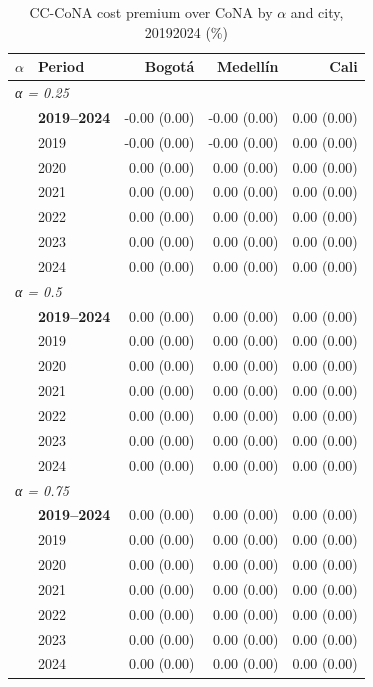 \begin{table}[htbp]
\centering\small
\caption{CC-CoNA cost premium over CoNA by $\alpha$ and city, 2019\textendash{}2024 (\%)}
\label{tab:ccona_premium}
\begin{tabular}{llrrr}
\toprule
\multicolumn{1}{c}{$\alpha$} & Period & Bogot\'{a} & Medell\'{i}n & Cali \\
\midrule
\multicolumn{5}{l}{\textit{α = 0.25}} \\
 & \textbf{2019–2024} & -0.00 (0.00) & -0.00 (0.00) & 0.00 (0.00) \\
 & 2019 & -0.00 (0.00) & -0.00 (0.00) & 0.00 (0.00) \\
 & 2020 & 0.00 (0.00) & 0.00 (0.00) & 0.00 (0.00) \\
 & 2021 & 0.00 (0.00) & 0.00 (0.00) & 0.00 (0.00) \\
 & 2022 & 0.00 (0.00) & 0.00 (0.00) & 0.00 (0.00) \\
 & 2023 & 0.00 (0.00) & 0.00 (0.00) & 0.00 (0.00) \\
 & 2024 & 0.00 (0.00) & 0.00 (0.00) & 0.00 (0.00) \\
\midrule
\multicolumn{5}{l}{\textit{α = 0.5}} \\
 & \textbf{2019–2024} & 0.00 (0.00) & 0.00 (0.00) & 0.00 (0.00) \\
 & 2019 & 0.00 (0.00) & 0.00 (0.00) & 0.00 (0.00) \\
 & 2020 & 0.00 (0.00) & 0.00 (0.00) & 0.00 (0.00) \\
 & 2021 & 0.00 (0.00) & 0.00 (0.00) & 0.00 (0.00) \\
 & 2022 & 0.00 (0.00) & 0.00 (0.00) & 0.00 (0.00) \\
 & 2023 & 0.00 (0.00) & 0.00 (0.00) & 0.00 (0.00) \\
 & 2024 & 0.00 (0.00) & 0.00 (0.00) & 0.00 (0.00) \\
\midrule
\multicolumn{5}{l}{\textit{α = 0.75}} \\
 & \textbf{2019–2024} & 0.00 (0.00) & 0.00 (0.00) & 0.00 (0.00) \\
 & 2019 & 0.00 (0.00) & 0.00 (0.00) & 0.00 (0.00) \\
 & 2020 & 0.00 (0.00) & 0.00 (0.00) & 0.00 (0.00) \\
 & 2021 & 0.00 (0.00) & 0.00 (0.00) & 0.00 (0.00) \\
 & 2022 & 0.00 (0.00) & 0.00 (0.00) & 0.00 (0.00) \\
 & 2023 & 0.00 (0.00) & 0.00 (0.00) & 0.00 (0.00) \\
 & 2024 & 0.00 (0.00) & 0.00 (0.00) & 0.00 (0.00) \\

\end{tabular}
\end{table}
